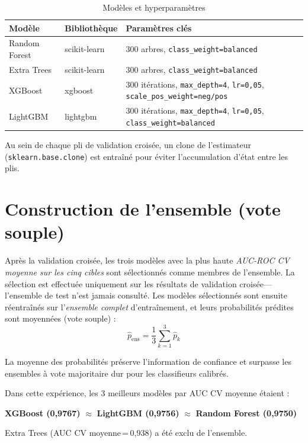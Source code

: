 \documentclass[12pt,a4paper]{report}
\begin{document}
\begin{table}[H]
\centering
\caption{Modèles et hyperparamètres}
\label{tab:models}
\begin{tabular}{llp{5.5cm}}
\toprule
\textbf{Modèle} & \textbf{Bibliothèque} & \textbf{Paramètres clés} \\
\midrule
Random Forest & scikit-learn & 300 arbres, \texttt{class\_weight=\textquotesingle{}balanced\textquotesingle{}} \\
Extra Trees & scikit-learn & 300 arbres, \texttt{class\_weight=\textquotesingle{}balanced\textquotesingle{}} \\
XGBoost & xgboost & 300 itérations, \texttt{max\_depth=4}, \texttt{lr=0,05}, \texttt{scale\_pos\_weight=neg/pos} \\
LightGBM & lightgbm & 300 itérations, \texttt{max\_depth=4}, \texttt{lr=0,05}, \texttt{class\_weight=\textquotesingle{}balanced\textquotesingle{}} \\
\bottomrule
\end{tabular}
\end{table}

Au sein de chaque pli de validation croisée, un clone de l'estimateur (\texttt{sklearn.base.clone}) est entraîné pour éviter l'accumulation d'état entre les plis.

\section{Construction de l'ensemble (vote souple)}

Après la validation croisée, les trois modèles avec la plus haute \emph{AUC-ROC CV moyenne sur les cinq cibles} sont sélectionnés comme membres de l'ensemble. La sélection est effectuée uniquement sur les résultats de validation croisée---l'ensemble de test n'est jamais consulté. Les modèles sélectionnés sont ensuite réentraînés sur l'\emph{ensemble complet} d'entraînement, et leurs probabilités prédites sont moyennées (vote souple) :
\[
\hat{p}_{\text{ens}} = \frac{1}{3} \sum_{k=1}^{3} \hat{p}_k
\]

La moyenne des probabilités préserve l'information de confiance et surpasse les ensembles à vote majoritaire dur pour les classifieurs calibrés.

Dans cette expérience, les 3 meilleurs modèles par AUC CV moyenne étaient :
\begin{center}
\textbf{XGBoost (0,9767)} $\approx$ \textbf{LightGBM (0,9756)} $\approx$ \textbf{Random Forest (0,9750)}
\end{center}
Extra Trees (AUC CV moyenne\,=\,0,938) a été exclu de l'ensemble.
\end{document}
